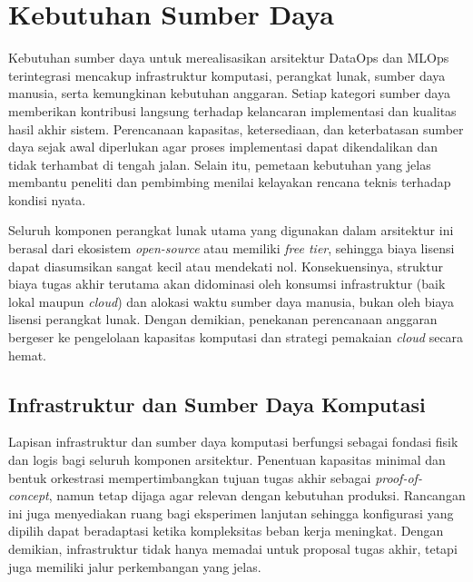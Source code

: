 \section{Kebutuhan Sumber Daya}

Kebutuhan sumber daya untuk merealisasikan arsitektur DataOps dan MLOps terintegrasi mencakup infrastruktur komputasi, perangkat lunak, sumber daya manusia, serta kemungkinan kebutuhan anggaran. Setiap kategori sumber daya memberikan kontribusi langsung terhadap kelancaran implementasi dan kualitas hasil akhir sistem. Perencanaan kapasitas, ketersediaan, dan keterbatasan sumber daya sejak awal diperlukan agar proses implementasi dapat dikendalikan dan tidak terhambat di tengah jalan. Selain itu, pemetaan kebutuhan yang jelas membantu peneliti dan pembimbing menilai kelayakan rencana teknis terhadap kondisi nyata.

Seluruh komponen perangkat lunak utama yang digunakan dalam arsitektur ini berasal dari ekosistem \textit{open-source} atau memiliki \textit{free tier}, sehingga biaya lisensi dapat diasumsikan sangat kecil atau mendekati nol. Konsekuensinya, struktur biaya tugas akhir terutama akan didominasi oleh konsumsi infrastruktur (baik lokal maupun \textit{cloud}) dan alokasi waktu sumber daya manusia, bukan oleh biaya lisensi perangkat lunak. Dengan demikian, penekanan perencanaan anggaran bergeser ke pengelolaan kapasitas komputasi dan strategi pemakaian \textit{cloud} secara hemat.

\subsection{Infrastruktur dan Sumber Daya Komputasi}

Lapisan infrastruktur dan sumber daya komputasi berfungsi sebagai fondasi fisik dan logis bagi seluruh komponen arsitektur. Penentuan kapasitas minimal dan bentuk orkestrasi mempertimbangkan tujuan tugas akhir sebagai \textit{proof-of-concept}, namun tetap dijaga agar relevan dengan kebutuhan produksi. Rancangan ini juga menyediakan ruang bagi eksperimen lanjutan sehingga konfigurasi yang dipilih dapat beradaptasi ketika kompleksitas beban kerja meningkat. Dengan demikian, infrastruktur tidak hanya memadai untuk proposal tugas akhir, tetapi juga memiliki jalur perkembangan yang jelas.

\vspace{0.5em}

